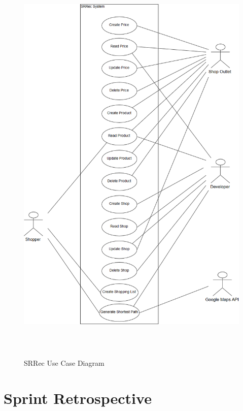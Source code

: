 \documentclass[12pt]{article}
\begin{document}
\begin{figure}[H]
  \includegraphics[width=\textwidth ,height=20cm]{UseCaseDiagram.png}
  \centering
  \caption{SRRec Use Case Diagram}
  \label{fig:Use Case Diagram}
\end{figure}


\section{Sprint Retrospective}
\end{document}
